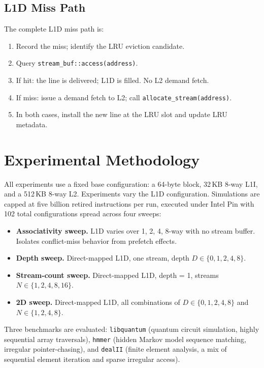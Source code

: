 \documentclass[11pt,letterpaper]{article}
\begin{document}
\subsection{L1D Miss Path}

The complete L1D miss path is:
\begin{enumerate}
    \item Record the miss; identify the LRU eviction candidate.
    \item Query \texttt{stream\_buf::access(address)}.
    \item If hit: the line is delivered; L1D is filled. No L2 demand fetch.
    \item If miss: issue a demand fetch to L2; call
          \texttt{allocate\_stream(address)}.
    \item In both cases, install the new line at the LRU slot and update LRU
          metadata.
\end{enumerate}

\section{Experimental Methodology}

All experiments use a fixed base configuration: a 64-byte block, 32\,KB
8-way L1I, and a 512\,KB 8-way L2. Experiments vary the L1D configuration.
Simulations are capped at five billion retired instructions per run, executed
under Intel Pin with 102 total configurations spread across four sweeps:

\begin{itemize}
    \item \textbf{Associativity sweep.} L1D varies over 1, 2, 4, 8-way with
          no stream buffer. Isolates conflict-miss behavior from prefetch
          effects.
    \item \textbf{Depth sweep.} Direct-mapped L1D, one stream, depth $D \in
          \{0,1,2,4,8\}$.
    \item \textbf{Stream-count sweep.} Direct-mapped L1D, depth = 1, streams
          $N \in \{1,2,4,8,16\}$.
    \item \textbf{2D sweep.} Direct-mapped L1D, all combinations of
          $D \in \{0,1,2,4,8\}$ and $N \in \{1,2,4,8\}$.
\end{itemize}

Three benchmarks are evaluated: \texttt{libquantum} (quantum circuit
simulation, highly sequential array traversals), \texttt{hmmer} (hidden Markov
model sequence matching, irregular pointer-chasing), and \texttt{dealII}
(finite element analysis, a mix of sequential element iteration and sparse
irregular access).
\end{document}
